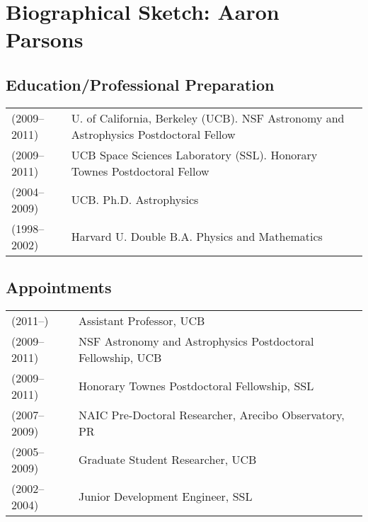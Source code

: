 \documentclass[apjpt4]{aastex}
\begin{document}
\section*{\Large Biographical Sketch: Aaron Parsons}


\subsection*{Education/Professional Preparation}
\vspace{-8pt}


\begin{tabular}{ll}
(2009--2011)& U. of California, Berkeley (UCB).  NSF Astronomy and
Astrophysics Postdoctoral Fellow\\
(2009--2011)& UCB Space Sciences Laboratory (SSL).  Honorary Townes Postdoctoral Fellow\\
(2004--2009)& UCB.  Ph.D. Astrophysics\\
(1998--2002)& Harvard U.  Double B.A. Physics and Mathematics\\
\end{tabular}

\subsection*{Appointments}
\vspace{-8pt}


\begin{tabular}{ll}
\vspace{-2pt}
(2011--\hfill)&Assistant Professor, UCB\\
(2009--2011) &NSF Astronomy and Astrophysics Postdoctoral Fellowship, UCB\\
(2009--2011) &Honorary Townes Postdoctoral Fellowship, SSL\\
(2007--2009) &NAIC Pre-Doctoral Researcher, Arecibo Observatory, PR\\
(2005--2009)& Graduate Student Researcher,  UCB\\
(2002--2004)& Junior Development Engineer, SSL\\
\end{tabular}
\end{document}
